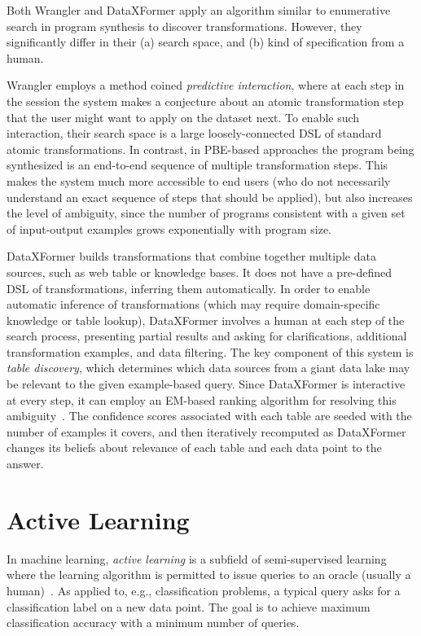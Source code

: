Both Wrangler and DataXFormer apply an algorithm similar to enumerative search in program synthesis to discover
transformations.
However, they significantly differ in their (a) search space, and (b) kind of specification from a human.

Wrangler employs a method coined \emph{predictive interaction}, where at each step in the session the system makes a
conjecture about an atomic transformation step that the user might want to apply on the dataset next.
To enable such interaction, their search space is a large loosely-connected DSL of standard atomic transformations.
In contrast, in PBE-based approaches the program being synthesized is an end-to-end sequence of multiple transformation
steps.
This makes the system much more accessible to end users (who do not necessarily understand an exact sequence of steps
that should be applied), but also increases the level of ambiguity, since the number of programs consistent with a given
set of input-output examples grows exponentially with program size.

DataXFormer builds transformations that combine together multiple data sources, such as web table or knowledge bases.
It does not have a pre-defined DSL of transformations, inferring them automatically.
In order to enable automatic inference of transformations (which may require domain-specific knowledge or table lookup),
DataXFormer involves a human at each step of the search process, presenting partial results and asking for
clarifications, additional transformation examples, and data filtering.
The key component of this system is \emph{table discovery}, which determines which data sources from a giant data lake
may be relevant to the given example-based query.
Since DataXFormer is interactive at every step, it can employ an EM-based ranking algorithm for resolving this
ambiguity~\cite{dataxformer}.
The confidence scores associated with each table are seeded with the number of examples it covers, and then iteratively
recomputed as DataXFormer changes its beliefs about relevance of each table and each data point to the answer.

\section{Active Learning}
In machine learning, \emph{active learning} is a subfield of semi-supervised learning where the learning algorithm is
permitted to issue queries to an oracle (usually a human)~\cite{al:settles}.
As applied to, e.g., classification problems, a typical query asks for a classification label on a new data point.
The goal is to achieve maximum classification accuracy with a minimum number of queries.

